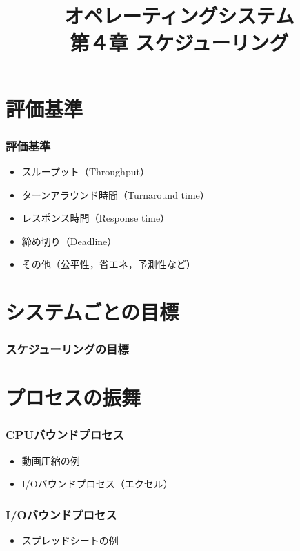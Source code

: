 \documentclass[dvipdfmx]{beamer}
\begin{document}
\title[OS]{オペレーティングシステム\\第４章 スケジューリング}
\date{}

\begin{frame}
  \titlepage
\end{frame}


\section{評価基準}
\begin{frame}
  \frametitle{評価基準}
  \begin{itemize}
    \item スループット（Throughput）
    \item ターンアラウンド時間（Turnaround time）
    \item レスポンス時間（Response time）
    \item 締め切り（Deadline）
    \item その他（公平性，省エネ，予測性など）
  \end{itemize}
\end{frame}

\section{システムごとの目標}
\begin{frame}
  \frametitle{スケジューリングの目標}
\end{frame}

\section{プロセスの振舞}
\begin{frame}
  \frametitle{CPUバウンドプロセス}
  \begin{itemize}
    \item 動画圧縮の例
    \item I/Oバウンドプロセス（エクセル）
  \end{itemize}
\end{frame}

\begin{frame}
  \frametitle{I/Oバウンドプロセス}
  \begin{itemize}
    \item スプレッドシートの例
  \end{itemize}
\end{frame}
\end{document}
